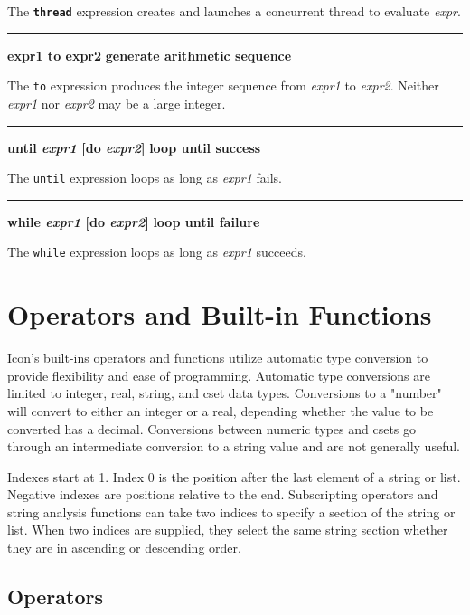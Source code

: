 \noindent
{}The \texttt{\bf thread} expression creates and launches
a concurrent thread to evaluate \textit{expr}.

\bigskip\hrule\vspace{0.1cm}
\noindent
{\bf expr1 to expr2 } \hfill {\bf generate arithmetic sequence}

\noindent
{}The \texttt{to} expression produces the integer
sequence from \textit{expr1} to \textit{expr2}.
Neither \textit{expr1} nor \textit{expr2} may be a large integer.

\bigskip\hrule\vspace{0.1cm}
\noindent
{\bf \textbf{until} \textit{expr1} [do \textit{expr2}] } \hfill {\bf loop until success}

\noindent
{}The \texttt{until} expression loops as long
as \textit{expr1} fails.

\bigskip\hrule\vspace{0.1cm}
\noindent
{\bf \textbf{while} \textit{expr1} [do \textit{expr2}] } \hfill {\bf loop until failure}

\noindent
{}The \texttt{while} expression loops as long as
\textit{expr1} succeeds.

\section{Operators and Built-in Functions}

Icon's built-ins operators and functions utilize
automatic type conversion to provide flexibility and ease of
programming. Automatic type
conversions are limited to
integer, real, string, and cset data types. Conversions to a "number" will
convert to either an integer or a real, depending whether the value to
be converted has a decimal. Conversions between numeric types and csets
go through an intermediate conversion to a string value and are not
generally useful.

Indexes start at 1. Index 0 is the position after the last element of a
string or list. Negative indexes are positions
relative to the end. Subscripting operators and string analysis
functions can take two indices to specify a section of the string or
list. When two indices are supplied, they select the same string
section whether they are in ascending or descending order.

\subsection*{Operators}

